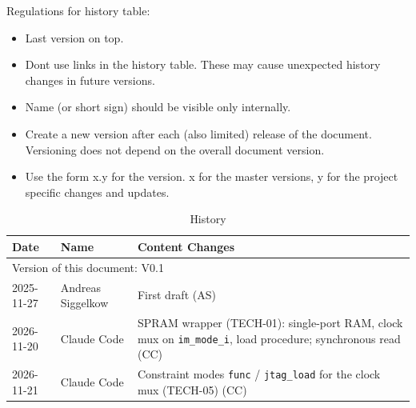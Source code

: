 Regulations for history table:
\begin{itemize}
  \item Last version on top.
  \item Dont use links in the history table. These may cause unexpected history changes in future versions.
  \item Name (or short sign) should be visible only internally.
  \item Create a new version after each (also limited) release of the document. Versioning does not depend on the overall document version.
  \item Use the form x.y for the version. x for the master versions, y for the project specific changes and updates.
\end{itemize}

\begin{table}[H]
\caption{History}
\label{tab:imemhistory01a}
\centering
\begin{tabularx}{\textwidth}{|X |X |X |}
  \hline
  Date & Name & Content Changes \\
  \hline
  \multicolumn{3}{|l|}{Version of this document: V0.1} \\
  \hline
  2025-11-27 & Andreas Siggelkow & First draft (AS) \\
  \hline
  2026-11-20 & Claude Code & SPRAM wrapper (TECH-01): single-port RAM, clock mux on \texttt{im\_mode\_i}, load procedure; synchronous read (CC) \\
  \hline
  2026-11-21 & Claude Code & Constraint modes \texttt{func} / \texttt{jtag\_load} for the clock mux (TECH-05) (CC) \\
  \hline
\end{tabularx}
\end{table}
